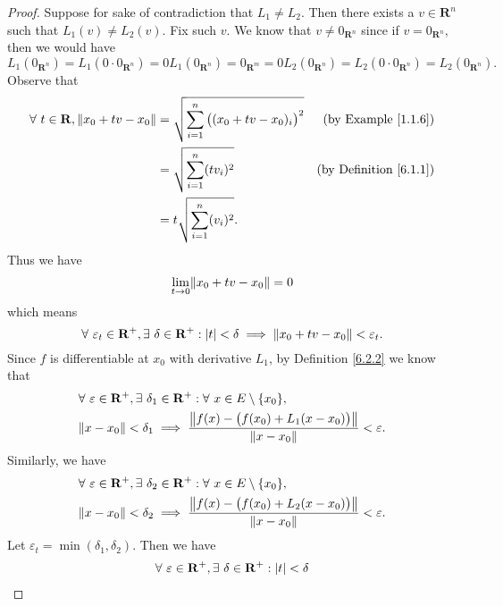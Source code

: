 \begin{proof}
    Suppose for sake of contradiction that \(L_1 \neq L_2\).
    Then there exists a \(v \in \mathbf{R}^n\) such that \(L_1(v) \neq L_2(v)\).
    Fix such \(v\).
    We know that \(v \neq 0_{\mathbf{R}^n}\) since if \(v = 0_{\mathbf{R}^n}\), then we would have
    \[
        L_1(0_{\mathbf{R}^n}) = L_1(0 \cdot 0_{\mathbf{R}^n}) = 0 L_1(0_{\mathbf{R}^n}) = 0_{\mathbf{R}^m} = 0 L_2(0_{\mathbf{R}^n}) = L_2(0 \cdot 0_{\mathbf{R}^n}) = L_2(0_{\mathbf{R}^n}).
    \]
    Observe that
    \begin{align*}
        \forall\ t \in \mathbf{R}, \norm*{x_0 + tv - x_0} & = \sqrt{\sum_{i = 1}^n \big((x_0 + tv - x_0)_i\big)^2} & \text{(by Example \ref{1.1.6})}    \\
                                                          & = \sqrt{\sum_{i = 1}^n (t v_i)^2}                      & \text{(by Definition \ref{6.1.1})} \\
                                                          & = t \sqrt{\sum_{i = 1}^n (v_i)^2}.
    \end{align*}
    Thus we have
    \[
        \lim_{t \to 0} \norm*{x_0 + tv - x_0} = 0
    \]
    which means
    \[
        \forall\ \varepsilon_t \in \mathbf{R}^+, \exists\ \delta \in \mathbf{R}^+ : \abs*{t} < \delta \implies \norm*{x_0 + tv - x_0} < \varepsilon_t.
    \]
    Since \(f\) is differentiable at \(x_0\) with derivative \(L_1\), by Definition \ref{6.2.2} we know that
    \begin{align*}
         & \forall\ \varepsilon \in \mathbf{R}^+, \exists\ \delta_1 \in \mathbf{R}^+ : \forall\ x \in E \setminus \{x_0\},           \\
         & \norm*{x - x_0} < \delta_1 \implies \frac{\norm*{f(x) - \big(f(x_0) + L_1(x - x_0)\big)}}{\norm*{x - x_0}} < \varepsilon.
    \end{align*}
    Similarly, we have
    \begin{align*}
         & \forall\ \varepsilon \in \mathbf{R}^+, \exists\ \delta_2 \in \mathbf{R}^+ : \forall\ x \in E \setminus \{x_0\},           \\
         & \norm*{x - x_0} < \delta_2 \implies \frac{\norm*{f(x) - \big(f(x_0) + L_2(x - x_0)\big)}}{\norm*{x - x_0}} < \varepsilon.
    \end{align*}
    Let \(\varepsilon_t = \min(\delta_1, \delta_2)\).
    Then we have
    \begin{align*}
                 & \forall\ \varepsilon \in \mathbf{R}^+, \exists\ \delta \in \mathbf{R}^+ : \abs*{t} < \delta \\

\end{align*}
\end{proof}
